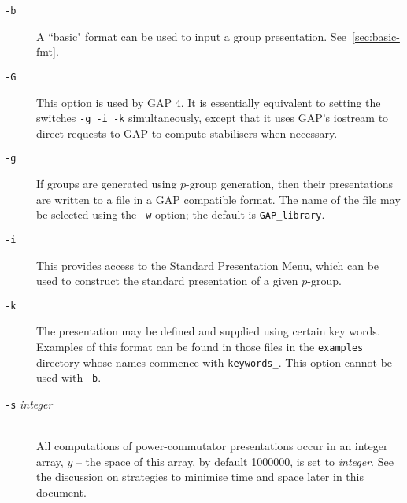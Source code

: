 \documentclass[12pt]{article}
\begin{document}
\enlargethispage*{1\baselineskip}
\begin{description}


\item[\texttt{-b}\hspace*{1em}]
      A ``basic" format can be used to input a group presentation.
      See~\ref{sec:basic-fmt}.

\item[\texttt{-G}\hspace*{1em}]
      This option is used by {\sf GAP} 4. It is essentially equivalent
      to setting the switches \texttt{-g -i -k} simultaneously, except
      that it uses {\sf GAP}'s iostream to direct requests to {\sf GAP}
      to compute stabilisers when necessary.

\item[\texttt{-g}\hspace*{1em}]
      If groups are generated using $p$-group generation, then 
      their presentations are written to a file
      in a {\sf GAP} compatible format.
      The name of the file may be selected using the \texttt{-w} option;
      the default is \texttt{GAP\_library}.

\item[\texttt{-i}\hspace*{1em}]
      This provides access to the Standard Presentation Menu,
      which can be used to construct the standard presentation
      of a given $p$-group.

\item[\texttt{-k}\hspace*{1em}]
      The presentation may be defined and supplied using certain
      key words. Examples of this format can be found in those 
      files in the \texttt{examples} directory whose names commence with 
      \texttt{keywords\_}. This option cannot be used with \texttt{-b}.

\item[\texttt{-s} {\it integer}]\ \\
      All computations of power-commutator presentations occur
      in an integer array, $y$ -- the space of this array,  by 
      default 1000000, is set to {\em integer}. See the discussion
      on strategies to minimise time and space later in this document.


\end{description}
\end{document}
